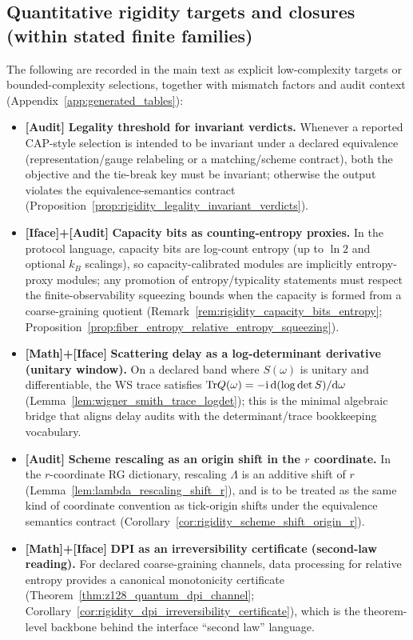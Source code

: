 \subsection{Quantitative rigidity targets and closures (within stated finite families)}
The following are recorded in the main text as explicit low-complexity targets or bounded-complexity selections, together with mismatch factors and audit context (Appendix~\ref{app:generated_tables}):
\begin{itemize}
\item \textbf{[Audit]} \textbf{Legality threshold for invariant verdicts.}
Whenever a reported CAP-style selection is intended to be invariant under a declared equivalence (representation/gauge relabeling or a matching/scheme contract), both the objective and the tie-break key must be invariant; otherwise the output violates the equivalence-semantics contract (Proposition~\ref{prop:rigidity_legality_invariant_verdicts}).
\item \textbf{[Iface]+[Audit]} \textbf{Capacity bits as counting-entropy proxies.}
In the protocol language, capacity bits are log-count entropy (up to $\ln 2$ and optional $k_B$ scalings), so capacity-calibrated modules are implicitly entropy-proxy modules; any promotion of entropy/typicality statements must respect the finite-observability squeezing bounds when the capacity is formed from a coarse-graining quotient (Remark~\ref{rem:rigidity_capacity_bits_entropy}; Proposition~\ref{prop:fiber_entropy_relative_entropy_squeezing}).
\item \textbf{[Math]+[Iface]} \textbf{Scattering delay as a log-determinant derivative (unitary window).}
On a declared band where $S(\omega)$ is unitary and differentiable, the WS trace satisfies $\mathrm{Tr} Q(\omega)=-\mathrm{i}\,\mathrm{d}(\log\det S)/\mathrm{d}\omega$ (Lemma~\ref{lem:wigner_smith_trace_logdet}); this is the minimal algebraic bridge that aligns delay audits with the determinant/trace bookkeeping vocabulary.
\item \textbf{[Audit]} \textbf{Scheme rescaling as an origin shift in the $r$ coordinate.}
In the $r$-coordinate RG dictionary, rescaling $\Lambda$ is an additive shift of $r$ (Lemma~\ref{lem:lambda_rescaling_shift_r}), and is to be treated as the same kind of coordinate convention as tick-origin shifts under the equivalence semantics contract (Corollary~\ref{cor:rigidity_scheme_shift_origin_r}).
\item \textbf{[Math]+[Iface]} \textbf{DPI as an irreversibility certificate (second-law reading).}
For declared coarse-graining channels, data processing for relative entropy provides a canonical monotonicity certificate (Theorem~\ref{thm:z128_quantum_dpi_channel}; Corollary~\ref{cor:rigidity_dpi_irreversibility_certificate}), which is the theorem-level backbone behind the interface ``second law'' language.

\end{itemize}
